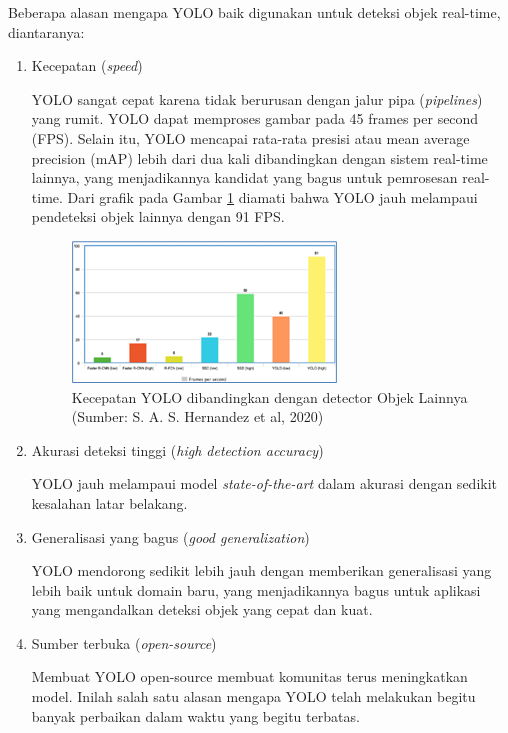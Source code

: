 Beberapa alasan mengapa YOLO baik digunakan untuk deteksi objek real-time, diantaranya:
\begin{enumerate}
	\item Kecepatan (\textit{speed})
	
	YOLO sangat cepat karena tidak berurusan dengan jalur pipa (\textit{pipelines}) yang rumit. YOLO dapat memproses gambar pada 45 frames per second (FPS). Selain itu, YOLO mencapai rata-rata presisi atau mean average precision (mAP) lebih dari dua kali dibandingkan dengan sistem real-time lainnya, yang menjadikannya kandidat yang bagus untuk pemrosesan real-time. Dari grafik pada Gambar \ref{img:Kecepatan-YOLO} diamati bahwa YOLO jauh melampaui pendeteksi objek lainnya dengan 91 FPS.
	
	\begin{figure}[H]
		\vspace{-0.1cm}
		\begin{center}
			\includegraphics[width=0.4\columnwidth]{bab2/Gambar/Picture29.png}
		\end{center}
		\vspace{-0.2cm}
		\captionsetup{justification=centering}
		\caption{Kecepatan YOLO dibandingkan dengan detector Objek Lainnya\\(Sumber: S. A. S. Hernandez et al, 2020)}\label{img:Kecepatan-YOLO}
	\end{figure}
	
	\item Akurasi deteksi tinggi (\textit{high detection accuracy})
	
	YOLO jauh melampaui model \textit{state-of-the-art} dalam akurasi dengan sedikit kesalahan latar belakang. 
	
	\item Generalisasi yang bagus (\textit{good generalization})
	
	YOLO mendorong sedikit lebih jauh dengan memberikan generalisasi yang lebih baik untuk domain baru, yang menjadikannya bagus untuk aplikasi yang mengandalkan deteksi objek yang cepat dan kuat. 
	
	\item Sumber terbuka (\textit{open-source})
	
	Membuat YOLO open-source membuat komunitas terus meningkatkan model. Inilah salah satu alasan mengapa YOLO telah melakukan begitu banyak perbaikan dalam waktu yang begitu terbatas. 
	
\end{enumerate}


